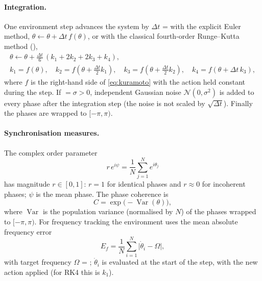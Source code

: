 \paragraph{Integration.} One environment step advances the system by
$\Delta t$ =  with the explicit Euler method,
$\theta \leftarrow \theta + \Delta t\, f(\theta)$, or with the classical
fourth-order Runge--Kutta method (),
\begin{gather*}
  \theta \leftarrow \theta + \tfrac{\Delta t}{6}\,(k_1 + 2k_2 + 2k_3 + k_4), \\
  k_1 = f(\theta),\quad
  k_2 = f(\theta + \tfrac{\Delta t}{2} k_1),\quad
  k_3 = f(\theta + \tfrac{\Delta t}{2} k_2),\quad
  k_4 = f(\theta + \Delta t\, k_3),
\end{gather*}
where $f$ is the right-hand side of \eqref{eq:kuramoto} with the action held
constant during the step. If  $= \sigma > 0$, independent
Gaussian noise $\mathcal{N}(0, \sigma^2)$ is added to every phase after the
integration step (the noise is not scaled by $\sqrt{\Delta t}$). Finally the
phases are wrapped to $[-\pi, \pi)$.

\paragraph{Synchronisation measures.} The complex order parameter
\begin{equation}
  r\,e^{i\psi} = \frac{1}{N} \sum_{j=1}^{N} e^{i\theta_j}
  \label{eq:order-parameter}
\end{equation}
has magnitude $r \in [0, 1]$: $r = 1$ for identical phases and $r \approx 0$
for incoherent phases; $\psi$ is the mean phase. The phase coherence is
\begin{equation}
  C = \exp\bigl(-\operatorname{Var}(\theta)\bigr),
  \label{eq:coherence}
\end{equation}
where $\operatorname{Var}$ is the population variance (normalised by $N$) of
the phases wrapped to $[-\pi, \pi)$. For frequency tracking the environment
uses the mean absolute frequency error
\begin{equation}
  E_f = \frac{1}{N} \sum_{i=1}^{N} \bigl|\dot\theta_i - \Omega\bigr|,
  \label{eq:freq-error}
\end{equation}
with target frequency $\Omega$ = ; $\dot\theta_i$ is
evaluated at the start of the step, with the new action applied (for RK4 this
is $k_1$).

